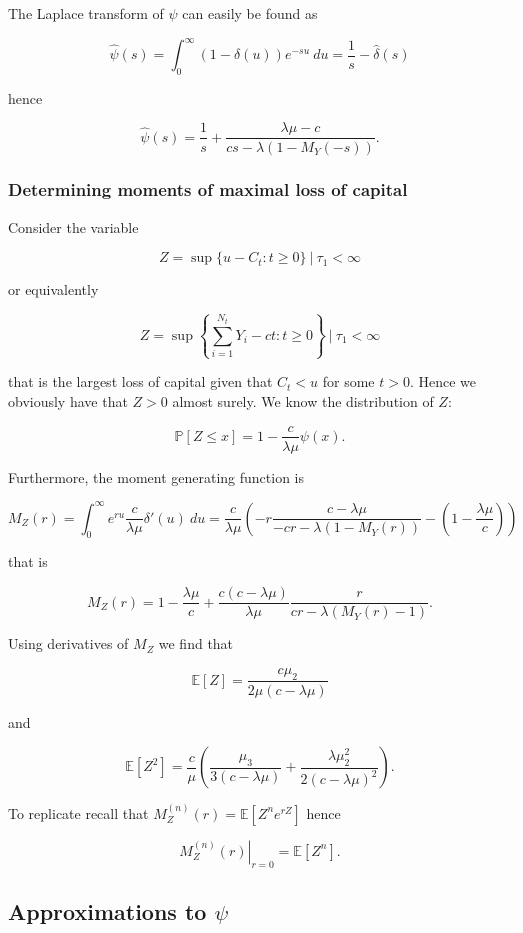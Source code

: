 \documentclass[a4paper,12pt,openany]{book}
\begin{document}
The Laplace transform of \(\psi\) can easily be found as

\[
\hat\psi(s)=\int_0^\infty(1-\delta(u))e^{-su}\ du=\frac{1}{s}-\hat\delta(s)
\]

hence

\[
\hat\psi(s)=\frac{1}{s}+\frac{\lambda \mu-c}{cs-\lambda(1-M_Y(-s))}.
\]

\hypertarget{determining-moments-of-maximal-loss-of-capital}{%
\subsubsection{Determining moments of maximal loss of capital}\label{determining-moments-of-maximal-loss-of-capital}}

Consider the variable

\[
Z=\sup\{u-C_t : t\ge 0\}\ \vert\ \tau_1<\infty
\]

or equivalently

\[
Z=\sup\left\{\sum_{i=1}^{N_t}Y_i-ct : t\ge 0\right\}\ \vert\ \tau_1<\infty
\]

that is the largest loss of capital given that \(C_t<u\) for some \(t>0\). Hence we obviously have that \(Z>0\) almost surely. We know the distribution of \(Z\):

\[
\mathbb P[Z\le x]=1-\frac{c}{\lambda \mu}\psi(x).
\]

Furthermore, the moment generating function is

\[
M_Z(r)=\int_0^\infty e^{ru}\frac{c}{\lambda \mu}\delta'(u)\ du=\frac{c}{\lambda \mu}\left(-r\frac{c-\lambda \mu}{-cr-\lambda(1-M_Y(r))}-\left(1-\frac{\lambda\mu}{c}\right)\right)
\]

that is

\[
M_Z(r)=1-\frac{\lambda\mu}{c}+\frac{c(c-\lambda \mu)}{\lambda\mu}\frac{r}{cr-\lambda(M_Y(r)-1)}.
\]

Using derivatives of \(M_Z\) we find that

\[
\mathbb E[Z]=\frac{c\mu_2}{2\mu(c-\lambda\mu)}
\]

and

\[
\mathbb E[Z^2]=\frac{c}{\mu}\left(\frac{\mu_3}{3(c-\lambda\mu)} + \frac{\lambda\mu_2^2}{2(c-\lambda\mu)^2}\right).
\]

To replicate recall that \(M_Z^{(n)}(r)=\mathbb E[Z^ne^{rZ}]\) hence

\[
\left.M_Z^{(n)}(r)\right\vert_{r=0}=\mathbb E[Z^n].
\]

\hypertarget{approximations-to-psi}{%
\subsection{\texorpdfstring{Approximations to \(\psi\)}{Approximations to \textbackslash psi}}\label{approximations-to-psi}}
\end{document}
